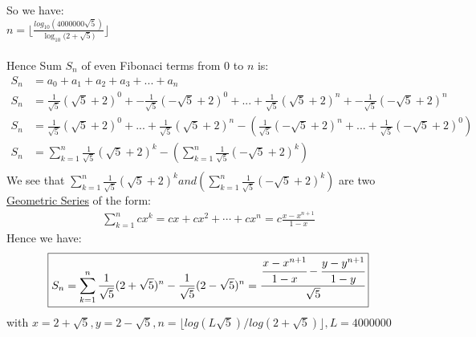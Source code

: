 \documentclass[12pt]{report}
\begin{document}
So we have: \\
\(n = \lfloor \frac{log_{10}({4000000\sqrt{5}})}{\log_{10}{(2+\sqrt{5}})} \rfloor \) \\ \\
Hence Sum \(S_n\) of even Fibonaci terms from 0 to \(n\) is:
\begin{equation} \label{eq:a8}
\begin{aligned}
 S_n &= a_0 + a_1 + a_2 + a_3 + ... + a_n \\
 S_n &=  \frac{1}{\sqrt{5}}(\sqrt{5} + 2)^0 + -\frac{1}{\sqrt{5}}(-\sqrt{5} + 2)^0 + ... +  \frac{1}{\sqrt{5}}(\sqrt{5} + 2)^n + -\frac{1}{\sqrt{5}}(-\sqrt{5} + 2)^n \\
 S_n &=  \frac{1}{\sqrt{5}}(\sqrt{5} + 2)^0 + ...+ \frac{1}{\sqrt{5}}(\sqrt{5} + 2)^n - (\frac{1}{\sqrt{5}}(-\sqrt{5} + 2)^n + ... +\frac{1}{\sqrt{5}}(-\sqrt{5} + 2)^0) \\
S_n &=  \sum_{k=1}^{n} \frac{1}{\sqrt{5}}(\sqrt{5} + 2)^k - (\sum_{k=1}^{n} \frac{1}{\sqrt{5}}(-\sqrt{5} + 2)^k) \\
\end{aligned}
\end{equation} 
We see that \(\sum_{k=1}^{n} \frac{1}{\sqrt{5}}(\sqrt{5} + 2)^k and (\sum_{k=1}^{n} \frac{1}{\sqrt{5}}(-\sqrt{5} + 2)^k)\) are two \href{http://en.wikipedia.org/wiki/Geometric_series}{Geometric Series} of the form:
\begin{equation} \label{eq:a9}
\begin{aligned}
\sum_{k=1}^{n} cx^k = cx+cx^2+ \cdots + cx^n= c\frac{x-x^{n+1}}{1-x}
\end{aligned}
\end{equation} 
Hence we have:
\begin{equation} \label{eq:a10}
\boxed{
 S_n = \sum_{k=1}^{n}  \frac{1}{\sqrt{5}}(2+\sqrt{5})^n-\frac{1}{\sqrt{5}}(2-\sqrt{5})^n = \displaystyle \cfrac{\cfrac{x-x^{n+1}}{1-x}-\cfrac{y-y^{n+1}}{1-y}}{\sqrt{5}} \\
}
\end{equation} 
with \(x=2+\sqrt{5}, y=2−\sqrt{5}, n = \lfloor log(L\sqrt{5})/log(2+\sqrt{5})\rfloor, L = 4000000\) 
\end{document}
